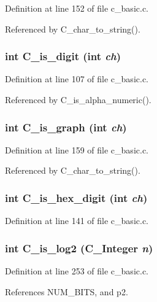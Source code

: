 Definition at line 152 of file c\_\-basic.c.

Referenced by C\_\-char\_\-to\_\-string().
\subsubsection{\setlength{\rightskip}{0pt plus 5cm}int C\_\-is\_\-digit (int {\em ch})}\label{c__basic_8c_3394dec4989e7893a34db2041fb93cb7}




Definition at line 107 of file c\_\-basic.c.

Referenced by C\_\-is\_\-alpha\_\-numeric().
\subsubsection{\setlength{\rightskip}{0pt plus 5cm}int C\_\-is\_\-graph (int {\em ch})}\label{c__basic_8c_604f6f0697bf7389dfa72539a7e850bf}




Definition at line 159 of file c\_\-basic.c.

Referenced by C\_\-char\_\-to\_\-string().
\subsubsection{\setlength{\rightskip}{0pt plus 5cm}int C\_\-is\_\-hex\_\-digit (int {\em ch})}\label{c__basic_8c_4dfe30f969fa9b6b5bebc9b973f95703}




Definition at line 141 of file c\_\-basic.c.
\subsubsection{\setlength{\rightskip}{0pt plus 5cm}int C\_\-is\_\-log2 (\bf{C\_\-Integer} {\em n})}\label{c__basic_8c_5a73b745b65284d2ac1738e01f815025}




Definition at line 253 of file c\_\-basic.c.

References NUM\_\-BITS, and p2.
